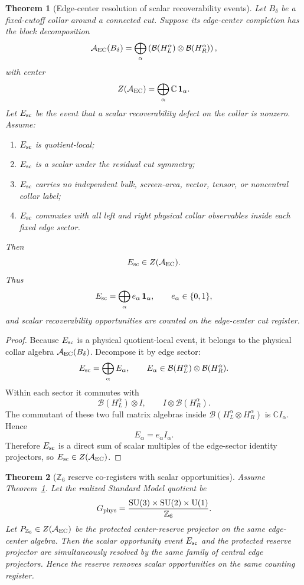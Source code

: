 \documentclass[11pt]{article}
\newtheorem{theorem}{Theorem}[section]
\newcommand{\SU}{\mathrm{SU}}
\newcommand{\U}{\mathrm{U}}
\newcommand{\Zsix}{\mathbb Z_6}
\begin{document}
\begin{theorem}[Edge-center resolution of scalar recoverability events]\label{thm:edge-center-scalar}
Let \(B_\delta\) be a fixed-cutoff collar around a connected cut. Suppose its edge-center completion
has the block decomposition
\[
\mathcal A_{\rm EC}(B_\delta)
=
\bigoplus_\alpha
\left(
\mathcal B(H_L^\alpha)\otimes\mathcal B(H_R^\alpha)
\right),
\]
with center
\[
Z(\mathcal A_{\rm EC})
=
\bigoplus_\alpha\mathbb C\,\mathbf 1_\alpha .
\]
Let \(E_{\rm sc}\) be the event that a scalar recoverability defect on the collar is nonzero.
Assume:
\begin{enumerate}[leftmargin=2em]
\item \(E_{\rm sc}\) is quotient-local;
\item \(E_{\rm sc}\) is a scalar under the residual cut symmetry;
\item \(E_{\rm sc}\) carries no independent bulk, screen-area, vector, tensor, or noncentral collar
label;
\item \(E_{\rm sc}\) commutes with all left and right physical collar observables inside each fixed
edge sector.
\end{enumerate}
Then
\[
E_{\rm sc}\in Z(\mathcal A_{\rm EC}).
\]
Thus
\[
E_{\rm sc}
=
\bigoplus_\alpha e_\alpha\,\mathbf 1_\alpha,
\qquad
e_\alpha\in\{0,1\},
\]
and scalar recoverability opportunities are counted on the edge-center cut register.
\end{theorem}

\begin{proof}
Because \(E_{\rm sc}\) is a physical quotient-local event, it belongs to the physical collar algebra
\(\mathcal A_{\rm EC}(B_\delta)\). Decompose it by edge sector:
\[
E_{\rm sc}=\bigoplus_\alpha E_\alpha,
\qquad
E_\alpha\in\mathcal B(H_L^\alpha)\otimes\mathcal B(H_R^\alpha).
\]
Within each sector it commutes with
\[
\mathcal B(H_L^\alpha)\otimes I,
\qquad
I\otimes\mathcal B(H_R^\alpha).
\]
The commutant of these two full matrix algebras inside
\(\mathcal B(H_L^\alpha\otimes H_R^\alpha)\) is \(\mathbb C I_\alpha\). Hence
\[
E_\alpha=e_\alpha I_\alpha.
\]
Therefore \(E_{\rm sc}\) is a direct sum of scalar multiples of the edge-sector identity
projectors, so \(E_{\rm sc}\in Z(\mathcal A_{\rm EC})\).
\end{proof}

\begin{theorem}[\(\Zsix\) reserve co-registers with scalar opportunities]\label{thm:z6-coregister}
Assume Theorem~\ref{thm:edge-center-scalar}. Let the realized Standard Model quotient be
\[
G_{\rm phys}
=
\frac{\SU(3)\times\SU(2)\times\U(1)}{\Zsix}.
\]
Let \(P_{\Zsix}\in Z(\mathcal A_{\rm EC})\) be the protected center-reserve projector on the same
edge-center algebra. Then the scalar opportunity event \(E_{\rm sc}\) and the protected reserve
projector are simultaneously resolved by the same family of central edge projectors. Hence the
reserve removes scalar opportunities on the same counting register.
\end{theorem}
\end{document}
